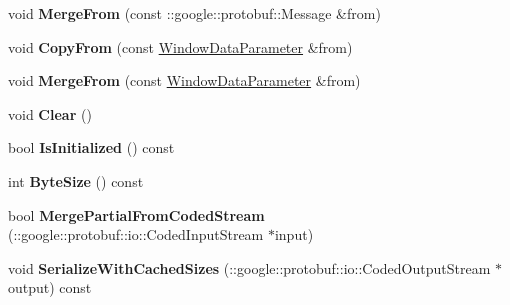 \begin{DoxyCompactItemize}
\item 
\mbox{\label{classcaffe_1_1_window_data_parameter_a465de22fa1b67851094cbfcd3fe3ad9e}} 
void {\bfseries Merge\+From} (const \+::google\+::protobuf\+::\+Message \&from)
\item 
\mbox{\label{classcaffe_1_1_window_data_parameter_a145047f2156f87ca926399743f0912de}} 
void {\bfseries Copy\+From} (const \mbox{\hyperlink{classcaffe_1_1_window_data_parameter}{Window\+Data\+Parameter}} \&from)
\item 
\mbox{\label{classcaffe_1_1_window_data_parameter_ac9b423bfe710f71e1d3458e1e255aa05}} 
void {\bfseries Merge\+From} (const \mbox{\hyperlink{classcaffe_1_1_window_data_parameter}{Window\+Data\+Parameter}} \&from)
\item 
\mbox{\label{classcaffe_1_1_window_data_parameter_ae2e14bc4a3381e54fcdcdd71171f98f7}} 
void {\bfseries Clear} ()
\item 
\mbox{\label{classcaffe_1_1_window_data_parameter_a3221a39adddb31e2affe805e4f7f947e}} 
bool {\bfseries Is\+Initialized} () const
\item 
\mbox{\label{classcaffe_1_1_window_data_parameter_aa7567ce7ffbb847f0425a85d9a6b760a}} 
int {\bfseries Byte\+Size} () const
\item 
\mbox{\label{classcaffe_1_1_window_data_parameter_aca8c6b88bb7f15ee7d248f8497ad44d4}} 
bool {\bfseries Merge\+Partial\+From\+Coded\+Stream} (\+::google\+::protobuf\+::io\+::\+Coded\+Input\+Stream $\ast$input)
\item 
\mbox{\label{classcaffe_1_1_window_data_parameter_ac47181ac7a2918466e3e157d4dbcd360}} 
void {\bfseries Serialize\+With\+Cached\+Sizes} (\+::google\+::protobuf\+::io\+::\+Coded\+Output\+Stream $\ast$output) const
\item 
\mbox{\label{classcaffe_1_1_window_data_parameter_ab61990796e2dfa545702a58e4c62f386}} 

\end{DoxyCompactItemize}

